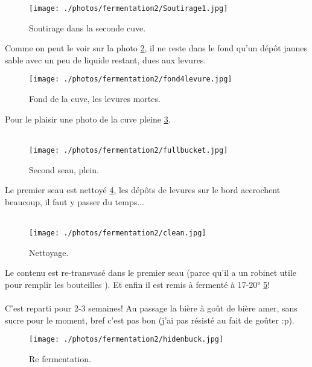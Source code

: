 \documentclass[twoside,twocolumn]{report}
\begin{document}
			\begin{figure}[h!]
				\centering
				\texttt{[image: ./photos/fermentation2/Soutirage1.jpg]}
				\caption{Soutirage dans la seconde cuve.}
				\label{soutirage}
			\end{figure}	
			Comme on peut le voir sur la photo \ref{levu}, il ne reste dans le fond qu'un dépôt jaunes sable avec un peu de liquide restant, dues aux levures.
			\begin{figure}[h!]
				\centering
				\texttt{[image: ./photos/fermentation2/fond4levure.jpg]}
				\caption{Fond de la cuve, les levures mortes.}
				\label{levu}
			\end{figure}
			Pour le plaisir une photo de la cuve pleine \ref{full}.\\ \\
			\begin{figure}[h!]
				\centering
				\texttt{[image: ./photos/fermentation2/fullbucket.jpg]}
				\caption{Second seau, plein.}
				\label{full}
			\end{figure}
			Le premier seau est nettoyé \ref{clean}, les dépôts de levures sur le bord accrochent beaucoup, il faut y passer du temps...\\ \\
			\begin{figure}[h!]
				\centering
				\texttt{[image: ./photos/fermentation2/clean.jpg]}
				\caption{Nettoyage.}
				\label{clean}
			\end{figure} 
			Le contenu est re-transvasé dans le premier seau (parce qu'il a un robinet utile pour remplir les bouteilles ). Et enfin il est remis à fermenté à 17-20° \ref{hidden}!\\ \\
			C'est reparti pour 2-3 semaines! Au passage la bière à goût de bière amer, sans sucre pour le moment, bref c'est pas bon (j'ai pas résisté au fait de goûter :p).
			\begin{figure}[h!]
				\centering
				\texttt{[image: ./photos/fermentation2/hidenbuck.jpg]}
				\caption{Re fermentation.}
				\label{hidden}
			\end{figure} 
				 
\end{document}
